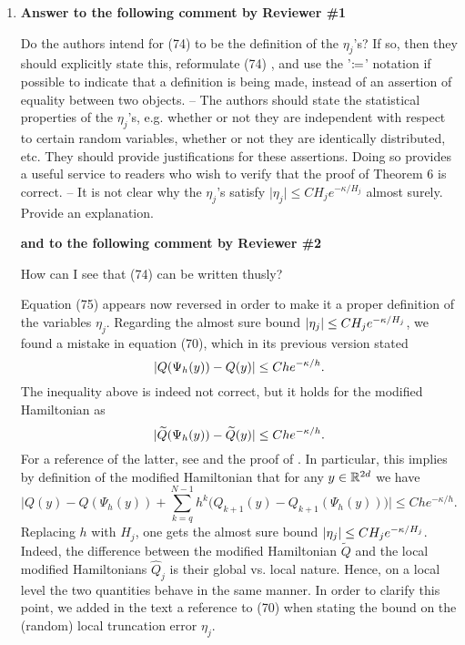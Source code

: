 \documentclass[10pt]{article}
\begin{document}
\begin{enumerate}
	\item \textbf{Answer to the following comment by Reviewer \#1}
	\begin{itquote}
		Do the authors intend for (74) {} to be the definition of the $\eta_j$'s? If so, then they should explicitly state this, reformulate (74) {}, and use the '$\coloneqq$' notation if possible to indicate that a definition is being made, instead of an assertion of equality between two objects. -- The authors should state the statistical properties of the $\eta_j$'s, e.g. whether or not they are independent with respect to certain random variables, whether or not they are identically distributed, etc. They should provide justifications for these assertions. Doing so provides a useful service to readers who wish to verify that the proof of Theorem 6 is correct. -- It is not clear why the $\eta_j$'s satisfy $\vert\eta_j\vert\leq CH_j e^{-\kappa/H_j}$ almost surely. Provide an explanation.
	\end{itquote}
	\textbf{and to the following comment by Reviewer \#2}
	\begin{itquote}
		How can I see that (74) {} can be written thusly?
	\end{itquote}
	Equation (75) appears now reversed in order to make it a proper definition of the variables $\eta_j$. Regarding the almost sure bound $\lvert\eta_j\rvert \leq CH_je^{-\kappa/H_j}$, we found a mistake in equation (70), which in its previous version stated
	\begin{equation*}
		\lvert Q(\Psi_h(y)) - Q(y)\rvert \leq Che^{-\kappa/h}.
	\end{equation*}
	The inequality above is indeed not correct, but it holds for the modified Hamiltonian as
	\begin{equation*}
	\lvert\widetilde Q(\Psi_h(y)) - \widetilde Q(y)\rvert \leq Che^{-\kappa/h}.
	\end{equation*}
	For a reference of the latter, see \cite[Theorem IX.7.6]{HLW06} and the proof of \cite[Theorem IX.8.1]{HLW06}. In particular, this implies by definition of the modified Hamiltonian that for any $y \in \mathbb{R}^{2d}$ we have
	\begin{equation*}
		\Big\lvert Q(y) - Q(\Psi_h(y)) + \sum_{k=q}^{N-1} h^k \big(Q_{k+1}(y) - Q_{k+1}(\Psi_h(y))\big)\Big\rvert \leq Che^{-\kappa/h}.
	\end{equation*}
	Replacing $h$ with $H_j$, one gets the almost sure bound $\lvert\eta_j\rvert \leq CH_je^{-\kappa/H_j}$. Indeed, the difference between the modified Hamiltonian $\tilde Q$ and the local modified Hamiltonians $\hat Q_j$ is their global vs. local nature. Hence, on a local level the two quantities behave in the same manner. In order to clarify this point, we added in the text a reference to (70) when stating the bound on the (random) local truncation error $\eta_j$.
	

\end{enumerate}
\end{document}
